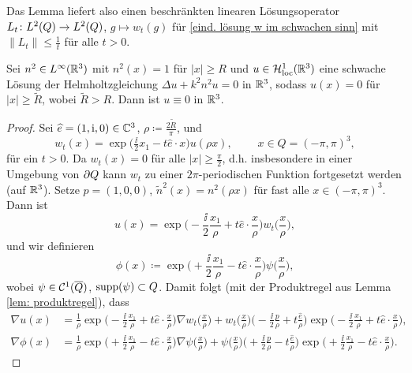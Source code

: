 Das Lemma liefert also einen beschränkten linearen Lösungsoperator \(L_t\colon L^2(Q) \to L^2(Q)\), \(g\mapsto w_t(g)\) für \eqref{eind. lösung w im schwachen sinn} mit \(\|L_t\|\leq\frac{1}{t}\) für alle \(t>0\).
\begin{satz}\label{satz: prinzip der eindeutigen Fortsetzbarkeit}
	Sei \(n^2\in L^\infty(\mathbb{R}^3)\) mit \(n^2(x)=1\) für \(|x|\geq R\) und \(u\in\mathcal{H}_{\mathrm{loc}}^1(\mathbb{R}^3)\) eine schwache Lösung der Helmholtzgleichung \(\Delta u+k^2n^2u=0\) in \(\mathbb{R}^3\), sodass \(u(x)=0\) für \(|x|\geq\widetilde{R}\), wobei \(\widetilde{R}>R\). Dann ist \(u\equiv0\) in \(\mathbb{R}^3\).
\end{satz}
\begin{proof}
	Sei \(\widehat{e}=(1,\mathrm{i},0)\in\mathbb{C}^3\), \(\rho\coloneqq\frac{2\widetilde{R}}{\pi}\), und
	\begin{equation*}
		w_t(x)=\exp\big(\tfrac{\ii}{2}x_1-t\widehat{e}\cdot x\big)u(\rho x),\qquad\; x\in Q=(-\pi,\pi)^3,
	\end{equation*}
	für ein \(t>0\). Da \(w_t(x)=0\) für alle \(|x|\geq\frac{\pi}{2}\), d.h. insbesondere in einer Umgebung von \(\partial Q\) kann \(w_t\) zu einer \(2\pi\)-periodischen Funktion fortgesetzt werden (auf \(\mathbb{R}^3\)). Setze \(p=(1,0,0)\), \(\widetilde{n}^2(x)=n^2(\rho x)\) für fast alle \(x\in(-\pi,\pi)^3\). Dann ist
	\begin{equation*}
		u(x)=\exp\Big(-\frac{\ii}{2}\frac{x_1}{\rho}+t\widehat{e}\cdot\frac{x}{\rho}\Big)w_t\Big(\frac{x}{\rho}\Big),
	\end{equation*}
	und wir definieren
	\begin{equation*}
		\phi(x)\coloneqq\exp\Big(+\frac{\ii}{2}\frac{x_1}{\rho}-t\widehat{e}\cdot\frac{x}{\rho}\Big)\psi\Big(\frac{x}{\rho}\Big),
	\end{equation*}
	wobei \(\psi\in\mathcal{C}^1(\overline{Q})\), \(\operatorname{supp}(\psi)\subset Q\). Damit folgt (mit der Produktregel aus Lemma \ref{lem: produktregel}), dass
	\begin{align*}
		\nabla u(x)&=\frac{1}{\rho}\exp\Big(-\frac{\ii}{2}\frac{x_1}{\rho} + t\widehat{e}\cdot\frac{x}{\rho}\Big)\nabla w_t\Big(\frac{x}{\rho}\Big)
			+w_t\Big(\frac{x}{\rho}\Big)\Big(-\frac{\ii}{2}\frac{p}{\rho}+t\frac{\widehat{e}}{\rho}\Big)\exp\Big(-\frac{\ii}{2}\frac{x_1}{\rho}+t\widehat{e}\cdot\frac{x}{\rho}\Big),\\
		\nabla \phi(x)&=\frac{1}{\rho}\exp\Big(+\frac{\ii}{2}\frac{x_1}{\rho}-t\widehat{e}\cdot\frac{x}{\rho}\Big)\nabla \psi\Big(\frac{x}{\rho}\Big)
			+\psi\Big(\frac{x}{\rho}\Big)\Big(+\frac{\ii}{2}\frac{p}{\rho}-t\frac{\widehat{e}}{\rho}\Big)\exp\Big(+\frac{\ii}{2}\frac{x_1}{\rho}-t\widehat{e}\cdot\frac{x}{\rho}\Big).

\end{align*}
\end{proof}
